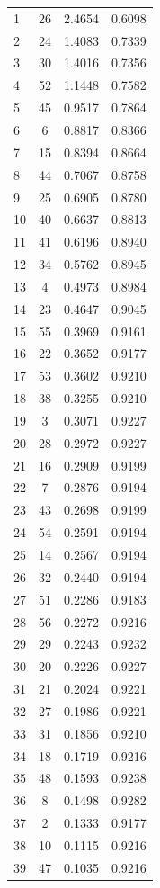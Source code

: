 \documentclass[12pt]{article}
\begin{document}
\begin{longtable}[!htbp]{lccc}
1 & 26 & 2.4654 & 0.6098\\
2 & 24 & 1.4083 & 0.7339\\
3 & 30 & 1.4016 & 0.7356\\
4 & 52 & 1.1448 & 0.7582\\
5 & 45 & 0.9517 & 0.7864\\
6 & 6 & 0.8817 & 0.8366\\
7 & 15 & 0.8394 & 0.8664\\
8 & 44 & 0.7067 & 0.8758\\
9 & 25 & 0.6905 & 0.8780\\
10 & 40 & 0.6637 & 0.8813\\
11 & 41 & 0.6196 & 0.8940\\
12 & 34 & 0.5762 & 0.8945\\
13 & 4 & 0.4973 & 0.8984\\
14 & 23 & 0.4647 & 0.9045\\
15 & 55 & 0.3969 & 0.9161\\
16 & 22 & 0.3652 & 0.9177\\
17 & 53 & 0.3602 & 0.9210\\
18 & 38 & 0.3255 & 0.9210\\
19 & 3 & 0.3071 & 0.9227\\
20 & 28 & 0.2972 & 0.9227\\
21 & 16 & 0.2909 & 0.9199\\
22 & 7 & 0.2876 & 0.9194\\
23 & 43 & 0.2698 & 0.9199\\
24 & 54 & 0.2591 & 0.9194\\
25 & 14 & 0.2567 & 0.9194\\
26 & 32 & 0.2440 & 0.9194\\
27 & 51 & 0.2286 & 0.9183\\
28 & 56 & 0.2272 & 0.9216\\
29 & 29 & 0.2243 & 0.9232\\
30 & 20 & 0.2226 & 0.9227\\
31 & 21 & 0.2024 & 0.9221\\
32 & 27 & 0.1986 & 0.9221\\
33 & 31 & 0.1856 & 0.9210\\
34 & 18 & 0.1719 & 0.9216\\
35 & 48 & 0.1593 & 0.9238\\
36 & 8 & 0.1498 & 0.9282\\
37 & 2 & 0.1333 & 0.9177\\
38 & 10 & 0.1115 & 0.9216\\
39 & 47 & 0.1035 & 0.9216\\

\end{longtable}
\end{document}

